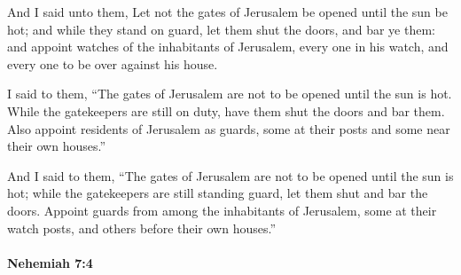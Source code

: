 			\begin{versebox}
					\item[BHS] 
					\item[LXX] 
					\item[ASV] And I said unto them, Let not the gates of Jerusalem be opened until the sun be hot; and while they stand on guard, let them shut the doors, and bar ye them: and appoint watches of the inhabitants of Jerusalem, every one in his watch, and every one to be over against his house.
					\item[NIV] I said to them, “The gates of Jerusalem are not to be opened until the sun is hot. While the gatekeepers are still on duty, have them shut the doors and bar them. Also appoint residents of Jerusalem as guards, some at their posts and some near their own houses.”
					\item[NRSV] And I said to them, “The gates of Jerusalem are not to be opened until the sun is hot; while the gatekeepers are still standing guard, let them shut and bar the doors. Appoint guards from among the inhabitants of Jerusalem, some at their watch posts, and others before their own houses.”
			\end{versebox}

		\paragraph{Nehemiah 7:4} %
			\label{NEHEMIAH-7-4}

